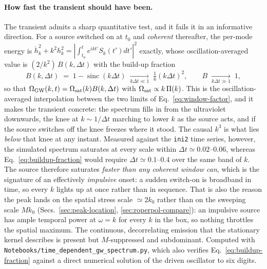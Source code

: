 \documentclass[10pt,prd,aps,nobibnotes,superscriptaddress,preprintnumbers,notitlepage]{revtex4-1}
\begin{document}
\paragraph{How fast the transient should have been.} The transient admits a sharp
quantitative test, and it fails it in an informative direction. For a source switched on at
$t_0$ and \emph{coherent} thereafter, the per-mode energy is
$\dot h_k^2+k^2h_k^2=|\int_{t_0}^{t}e^{ikt'}S_k(t')dt'|^2$ exactly, whose
oscillation-averaged value is $(2/k^2)\,B(k,\Delta t)$ with the build-up fraction
\begin{equation}
  B(k,\Delta t)\;=\;1-\operatorname{sinc}(k\Delta t)
  \;\xrightarrow[k\Delta t\ll1]{}\;\tfrac16(k\Delta t)^2,
  \qquad
  B\;\xrightarrow[k\Delta t\gg1]{}\;1,
  \label{eq:buildup-fraction}
\end{equation}
so that $\Omega_{\rm GW}(k,t)=\Omega_{\rm sat}(k)B(k,\Delta t)$ with
$\Omega_{\rm sat}\propto k\,\Pi(k)$. This is the oscillation-averaged interpolation between
the two limits of Eq.~\eqref{eq:window-factor}, and it makes the transient concrete: the
spectrum fills in from the ultraviolet downwards, the knee at $k\sim1/\Delta t$ marching to
lower $k$ as the source acts, and if the source switches off the knee freezes where it stood.
The causal $k^3$ is what lies \emph{below} that knee at any instant. Measured against the
\texttt{ini2} time series, however, the simulated spectrum saturates at every scale within
$\Delta t\simeq0.02$--$0.06$, whereas Eq.~\eqref{eq:buildup-fraction} would require
$\Delta t\simeq0.1$--$0.4$ over the same band of $k$. The source therefore saturates
\emph{faster than any coherent window can}, which is the signature of an effectively
\emph{impulsive} onset: a sudden switch-on is broadband in time, so every $k$ lights up at
once rather than in sequence. That is also the reason the peak lands on the spatial stress
scale $\simeq2k_0$ rather than on the sweeping scale $Mk_0$
(Secs.~\ref{sec:peak-location}, \ref{sec:roperpol-compare}): an impulsive source has ample
temporal power at $\omega=k$ for every $k$ in the box, so nothing throttles the spatial
maximum. The continuous, decorrelating emission that the stationary kernel describes is
present but $M$-suppressed and subdominant. Computed with
\texttt{Notebooks/time\_dependent\_gw\_spectrum.py}, which also verifies
Eq.~\eqref{eq:buildup-fraction} against a direct numerical solution of the driven oscillator
to six digits.
\end{document}
